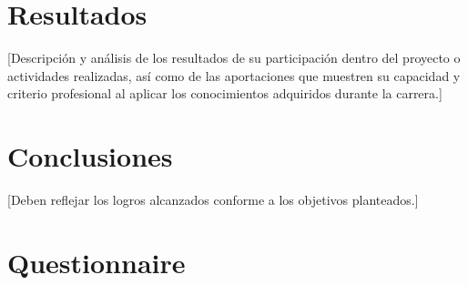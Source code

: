\documentclass[12pt]{caltech_thesis}
\begin{document}
\chapter{Resultados}

[Descripción y análisis de los resultados de su participación dentro del proyecto o actividades realizadas, así como de las aportaciones que muestren su capacidad y criterio profesional al aplicar los conocimientos adquiridos durante la carrera.]


\chapter{Conclusiones}

[Deben reflejar los logros alcanzados conforme a los objetivos planteados.]


\printbibliography[heading=bibintoc]


\appendix


\chapter{Questionnaire}

\end{document}
